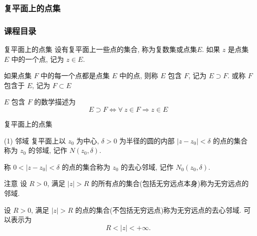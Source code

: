 \documentclass{beamer}
\begin{document}
\subsubsection{复平面上的点集}
\begin{frame}
\frametitle{课程目录}
\tableofcontents[currentsubsection ] %
\end{frame}

\begin{frame}{复平面上的点集}
设有复平面上一些点的集合, 称为复数集或点集$E$. 
如果 $ z $ 是点集 $ E $ 中的一个点, 记为 $ z\in E $. 

\bigskip

如果点集 $ F $ 中的每一个点都是点集 $ E $ 中的点, 则称 $ E $ 包含 $ F $,  记为 $ E \supset F $. 或称 $ F $ 包含于 $ E $, 记为 $ F \subset E  $ 

\bigskip

$ E $ 包含 $ F $ 的数学描述为
\[ E \supset F \Leftrightarrow \forall\: z\in F \Rightarrow z\in E \]

\end{frame}

\begin{frame}{复平面上的点集}
\begin{alertblock}{(1) 邻域}
复平面上以 $ z_0 $ 为中心, $ \delta > 0 $ 为半径的圆的内部 $ |z - z_0| < \delta $ 的点的集合称为 $ z_0 $ 的邻域, 记作 $ N(z_0, \delta) $. 

称 $ 0<|z - z_0|<\delta $ 的点的集合称为 $ z_0 $ 的去心邻域, 记作 $ N_0(z_0, \delta) $. 
\end{alertblock}

\begin{block}{注意}
设 $ R>0 $, 满足 $ |z|>R $ 的所有点的集合(包括无穷远点本身)称为无穷远点的邻域. 

设 $ R>0 $, 满足 $ |z|>R $ 的点的集合(不包括无穷远点)称为无穷远点的去心邻域. 可以表示为    
\[ R<|z|<+\infty. \]

\end{block}

\end{frame}
\end{document}
